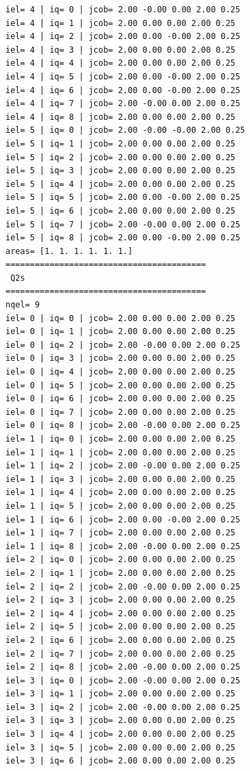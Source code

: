 \begin{tiny}
\begin{verbatim}
iel= 4 | iq= 0 | jcob= 2.00 -0.00 0.00 2.00 0.25
iel= 4 | iq= 1 | jcob= 2.00 0.00 0.00 2.00 0.25
iel= 4 | iq= 2 | jcob= 2.00 0.00 -0.00 2.00 0.25
iel= 4 | iq= 3 | jcob= 2.00 0.00 0.00 2.00 0.25
iel= 4 | iq= 4 | jcob= 2.00 0.00 0.00 2.00 0.25
iel= 4 | iq= 5 | jcob= 2.00 0.00 -0.00 2.00 0.25
iel= 4 | iq= 6 | jcob= 2.00 0.00 -0.00 2.00 0.25
iel= 4 | iq= 7 | jcob= 2.00 -0.00 0.00 2.00 0.25
iel= 4 | iq= 8 | jcob= 2.00 0.00 0.00 2.00 0.25
iel= 5 | iq= 0 | jcob= 2.00 -0.00 -0.00 2.00 0.25
iel= 5 | iq= 1 | jcob= 2.00 0.00 0.00 2.00 0.25
iel= 5 | iq= 2 | jcob= 2.00 0.00 0.00 2.00 0.25
iel= 5 | iq= 3 | jcob= 2.00 0.00 0.00 2.00 0.25
iel= 5 | iq= 4 | jcob= 2.00 0.00 0.00 2.00 0.25
iel= 5 | iq= 5 | jcob= 2.00 0.00 -0.00 2.00 0.25
iel= 5 | iq= 6 | jcob= 2.00 0.00 0.00 2.00 0.25
iel= 5 | iq= 7 | jcob= 2.00 -0.00 0.00 2.00 0.25
iel= 5 | iq= 8 | jcob= 2.00 0.00 -0.00 2.00 0.25
areas= [1. 1. 1. 1. 1. 1.]
=========================================
 Q2s
=========================================
nqel= 9
iel= 0 | iq= 0 | jcob= 2.00 0.00 0.00 2.00 0.25
iel= 0 | iq= 1 | jcob= 2.00 0.00 0.00 2.00 0.25
iel= 0 | iq= 2 | jcob= 2.00 -0.00 0.00 2.00 0.25
iel= 0 | iq= 3 | jcob= 2.00 0.00 0.00 2.00 0.25
iel= 0 | iq= 4 | jcob= 2.00 0.00 0.00 2.00 0.25
iel= 0 | iq= 5 | jcob= 2.00 0.00 0.00 2.00 0.25
iel= 0 | iq= 6 | jcob= 2.00 0.00 0.00 2.00 0.25
iel= 0 | iq= 7 | jcob= 2.00 0.00 0.00 2.00 0.25
iel= 0 | iq= 8 | jcob= 2.00 -0.00 0.00 2.00 0.25
iel= 1 | iq= 0 | jcob= 2.00 0.00 0.00 2.00 0.25
iel= 1 | iq= 1 | jcob= 2.00 0.00 0.00 2.00 0.25
iel= 1 | iq= 2 | jcob= 2.00 -0.00 0.00 2.00 0.25
iel= 1 | iq= 3 | jcob= 2.00 0.00 0.00 2.00 0.25
iel= 1 | iq= 4 | jcob= 2.00 0.00 0.00 2.00 0.25
iel= 1 | iq= 5 | jcob= 2.00 0.00 0.00 2.00 0.25
iel= 1 | iq= 6 | jcob= 2.00 0.00 -0.00 2.00 0.25
iel= 1 | iq= 7 | jcob= 2.00 0.00 0.00 2.00 0.25
iel= 1 | iq= 8 | jcob= 2.00 -0.00 0.00 2.00 0.25
iel= 2 | iq= 0 | jcob= 2.00 0.00 0.00 2.00 0.25
iel= 2 | iq= 1 | jcob= 2.00 0.00 0.00 2.00 0.25
iel= 2 | iq= 2 | jcob= 2.00 -0.00 0.00 2.00 0.25
iel= 2 | iq= 3 | jcob= 2.00 0.00 0.00 2.00 0.25
iel= 2 | iq= 4 | jcob= 2.00 0.00 0.00 2.00 0.25
iel= 2 | iq= 5 | jcob= 2.00 0.00 0.00 2.00 0.25
iel= 2 | iq= 6 | jcob= 2.00 0.00 0.00 2.00 0.25
iel= 2 | iq= 7 | jcob= 2.00 0.00 0.00 2.00 0.25
iel= 2 | iq= 8 | jcob= 2.00 -0.00 0.00 2.00 0.25
iel= 3 | iq= 0 | jcob= 2.00 -0.00 0.00 2.00 0.25
iel= 3 | iq= 1 | jcob= 2.00 0.00 0.00 2.00 0.25
iel= 3 | iq= 2 | jcob= 2.00 -0.00 0.00 2.00 0.25
iel= 3 | iq= 3 | jcob= 2.00 0.00 0.00 2.00 0.25
iel= 3 | iq= 4 | jcob= 2.00 0.00 0.00 2.00 0.25
iel= 3 | iq= 5 | jcob= 2.00 0.00 0.00 2.00 0.25
iel= 3 | iq= 6 | jcob= 2.00 0.00 0.00 2.00 0.25

\end{verbatim}
\end{tiny}
